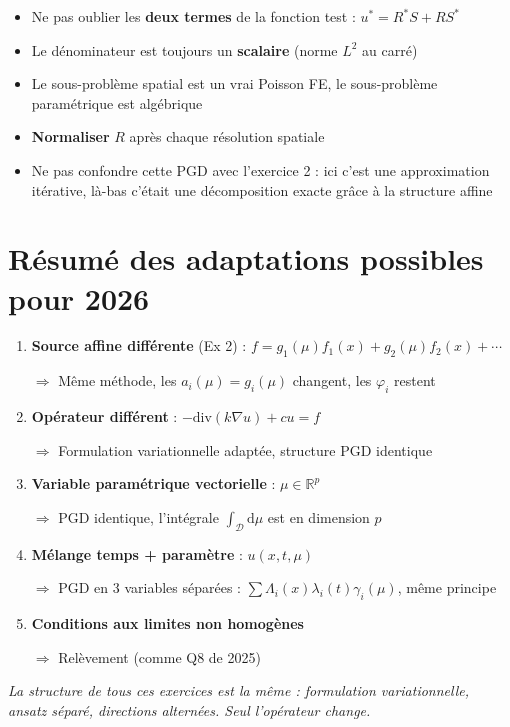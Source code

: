 \documentclass[11pt,a4paper]{article}
\begin{document}
\begin{warningbox}
\begin{itemize}[nosep]
\item Ne pas oublier les \textbf{deux termes} de la fonction test : $u^* = R^*S + RS^*$
\item Le d\'enominateur est toujours un \textbf{scalaire} (norme $L^2$ au carr\'e)
\item Le sous-probl\`eme spatial est un vrai Poisson FE, le sous-probl\`eme param\'etrique est alg\'ebrique
\item \textbf{Normaliser} $R$ apr\`es chaque r\'esolution spatiale
\item Ne pas confondre cette PGD avec l'exercice 2 : ici c'est une approximation it\'erative, l\`a-bas c'\'etait une d\'ecomposition exacte gr\^ace \`a la structure affine
\end{itemize}
\end{warningbox}

\section{R\'esum\'e des adaptations possibles pour 2026}

\begin{tipbox}
\begin{enumerate}[nosep]
\item \textbf{Source affine diff\'erente} (Ex 2) : $f = g_1(\mu)f_1(x) + g_2(\mu)f_2(x) + \cdots$

$\Rightarrow$ M\^eme m\'ethode, les $a_i(\mu) = g_i(\mu)$ changent, les $\varphi_i$ restent

\item \textbf{Op\'erateur diff\'erent} : $-\text{div}(k\nabla u) + cu = f$

$\Rightarrow$ Formulation variationnelle adapt\'ee, structure PGD identique

\item \textbf{Variable param\'etrique vectorielle} : $\mu \in \mathbb{R}^p$

$\Rightarrow$ PGD identique, l'int\'egrale $\int_\mathcal{D}\mathrm{d}\mu$ est en dimension $p$

\item \textbf{M\'elange temps + param\`etre} : $u(x,t,\mu)$

$\Rightarrow$ PGD en 3 variables s\'epar\'ees : $\sum \Lambda_i(x)\lambda_i(t)\gamma_i(\mu)$, m\^eme principe

\item \textbf{Conditions aux limites non homog\`enes}

$\Rightarrow$ Rel\`evement (comme Q8 de 2025)
\end{enumerate}
\end{tipbox}

\vfill
\begin{center}
\textit{La structure de tous ces exercices est la m\^eme : formulation variationnelle, ansatz s\'epar\'e, directions altern\'ees. Seul l'op\'erateur change.}
\end{center}
\end{document}
